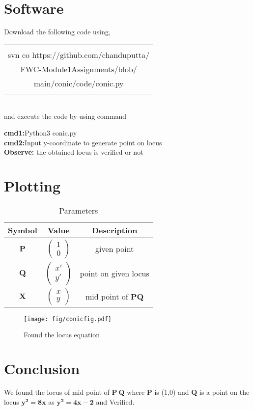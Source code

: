 \documentclass[journal,10pt,twocolumn]{article}
\newcommand{\myvec}[1]{\ensuremath{\begin{pmatrix}#1\end{pmatrix}}}
\let\vec\mathbf
\let\vec\mathbf
\begin{document}
\raggedright \section{Software}
Download the following code using,
\begin{table}[h]
    \centering
    \begin{tabular}{|c|}
    \hline \\
         svn co https://github.com/chanduputta/\\FWC-Module1Assignments/blob/\\main/conic/code/conic.py \\
         \\
\hline
    \end{tabular}
\end{table}
\\
and execute the code by using command
\begin{center}
\textbf{cmd1:}Python3  conic.py\\
\textbf{cmd2:}Input y-coordinate to generate point on locus\\
\textbf{Observe:} the obtained locus is verified or not\\
\end{center}

\raggedright \section{Plotting}
{\begin{table}[h]
    \centering
    \begin{tabular}{|c|c|c|}
       \hline
       \textbf{Symbol}&\textbf{Value}&\textbf{Description}  \\
       \hline
	    $\vec{P}$ & $\myvec{
		    1\\
		    0}$
	    & given point\\
        \hline
	    $\vec{Q}$ & $\myvec{x'\\y'}$
 &  point on given locus \\
        \hline
	    $\vec{X}$ & $\myvec{x\\y}$
 & mid point of $\vec{PQ}$  \\
       \hline
    \end{tabular}
    \caption{Parameters}
    \label{tab:my_label}
\end{table}

\begin{figure}[h]
    \centering
\texttt{[image: fig/conicfig.pdf]}
    \caption{Found the locus equation }
    \label{fig:my_label}
\end{figure}
\vspace{2cm}
}
\raggedright \section{Conclusion}
\begin{center}
We found the locus of mid point of $\vec{P\:Q}$ where $\vec{P}$ is (1,0) and $\vec{Q}$ is a point on the locus $\vec{y^{2} = 8x}$ as $\vec{y^{2} = 4x - 2}$ and Verified.
\end{center}
\end{document}

